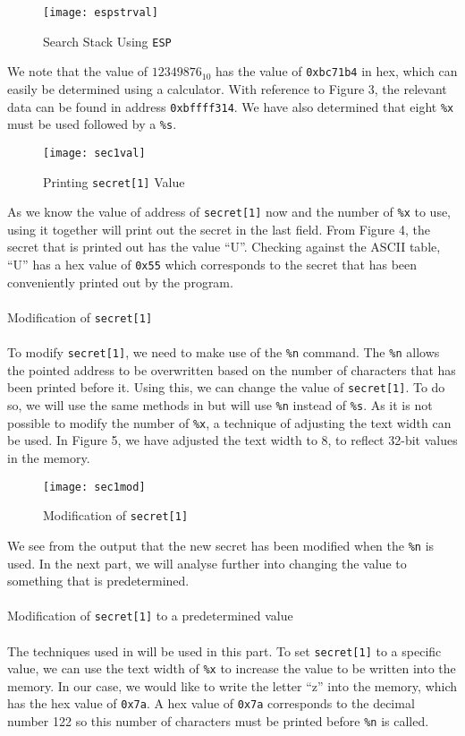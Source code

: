 \documentclass[a4paper,12pt]{article}
\newcommand*\circled[1]{\tikz[baseline=(char.base)]{
		\node[shape=circle,draw,inner sep=2pt] (char) {#1};}}
\begin{document}
\begin{figure}[H]
	\centering
	\texttt{[image: espstrval]}
	\caption{Search Stack Using \texttt{ESP}}
	\label{fig:espstrval}
\end{figure}
\noindent We note that the value of $12349876_{10}$ has the value of \texttt{0xbc71b4} in hex, which can easily be determined using a calculator. With reference to Figure 3, the relevant data can be found in address \texttt{0xbffff314}. We have also determined that eight \texttt{\%x} must be used followed by a \texttt{\%s}.
\begin{figure}[H]
	\centering
	\texttt{[image: sec1val]}
	\caption{Printing \texttt{secret[1]} Value}
	\label{fig:sec1val}
\end{figure}
\noindent As we know the value of address of \texttt{secret[1]} now and the number of \texttt{\%x} to use, using it together will print out the secret in the last field. From Figure 4, the secret that is printed out has the value ``U''. Checking against the ASCII table, ``U'' has a hex value of \texttt{0x55} which corresponds to the secret that has been conveniently printed out by the program.\\\\\circled{3} Modification of \texttt{secret[1]}\\\\To modify \texttt{secret[1]}, we need to make use of the \texttt{\%n} command. The \texttt{\%n} allows the pointed address to be overwritten based on the number of characters that has been printed before it. Using this, we can change the value of \texttt{secret[1]}. To do so, we will use the same methods in \circled{2} but will use \texttt{\%n} instead of \texttt{\%s}. As it is not possible to modify the number of \texttt{\%x}, a technique of adjusting the text width can be used. In Figure 5, we have adjusted the text width to 8, to reflect 32-bit values in the memory. 
\begin{figure}[H]
	\centering
	\texttt{[image: sec1mod]}
	\caption{Modification of \texttt{secret[1]}}
	\label{fig:sec1mod}
\end{figure}
\noindent We see from the output that the new secret has been modified when the \texttt{\%n} is used. In the next part, we will analyse further into changing the value to something that is predetermined.\\\\
\circled{4} Modification of \texttt{secret[1]} to a predetermined value\\\\The techniques used in \circled{3} will be used in this part. To set \texttt{secret[1]} to a specific value, we can use the text width of \texttt{\%x} to increase the value to be written into the memory. In our case, we would like to write the letter ``z'' into the memory, which has the hex value of \texttt{0x7a}. A hex value of \texttt{0x7a} corresponds to the decimal number 122 so this number of characters must be printed before \texttt{\%n} is called.
\end{document}
